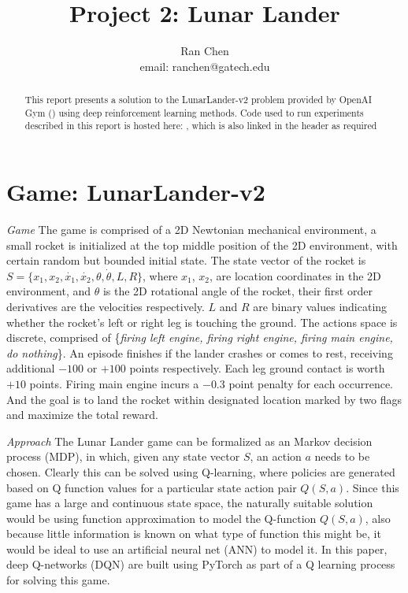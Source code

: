 \documentclass[10pt]{article}
\author{Ran Chen \\ email: ranchen@gatech.edu\vspace{-2ex}}
\title{\vspace{-1.8cm}Project 2: Lunar Lander}
\date{}
\begin{document}
\maketitle
\thispagestyle{fancy}


\begin{abstract}
This report presents a solution to the LunarLander-v2 problem provided by OpenAI Gym () using deep reinforcement learning methods. Code used to run experiments described in this report is hosted here: , which is also linked in the header as required
\end{abstract}

\section{Game: LunarLander-v2} \label{game}

\textit{Game} The game is comprised of a 2D Newtonian mechanical environment, a small rocket is initialized at the top middle position of the 2D environment, with certain random but bounded initial state. The state vector of the rocket is $S=\{x_1, x_2, \dot{x_1}, \dot{x_2}, \theta, \dot{\theta}, L, R\}$, where $x_1$, $x_2$, are location coordinates in the 2D environment, and $\theta$ is the 2D rotational angle of the rocket, their first order derivatives are the velocities respectively. $L$ and $R$ are binary values indicating whether the rocket's left or right leg is touching the ground. The actions space is discrete, comprised of \{\textit{firing left engine, firing right engine, firing main engine, do nothing}\}. An episode finishes if the lander crashes or comes to rest, receiving additional $-100$ or $+100$ points respectively. Each leg ground contact is worth $+10$ points. Firing main engine incurs a $-0.3$ point penalty for each occurrence. And the goal is to land the rocket within designated location marked by two flags and maximize the total reward.\par
\bigbreak
\noindent
\textit{Approach} The Lunar Lander game can be formalized as an Markov decision process (MDP), in which, given any state vector $S$, an action $a$ needs to be chosen. Clearly this can be solved using Q-learning, where policies are generated based on Q function values for a particular state action pair $Q(S,a)$. Since this game has a large and continuous state space, the naturally suitable solution would be using function approximation to model the Q-function $Q(S,a)$, also because little information is known on what type of function this might be, it would be ideal to use an artificial neural net (ANN) to model it. In this paper, deep Q-networks (DQN) are built using PyTorch as part of a Q learning process for solving this game. 
\end{document}

